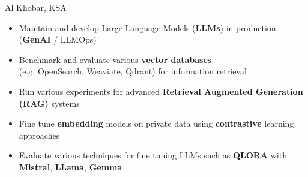 \documentclass[10pt,a4paper,ragged2e]{altacv}
\begin{document}

\begin{fullwidth}
\makecvheader
\end{fullwidth}



     {Al Khobar, KSA}

\begin{itemize}
	\item  Maintain and develop Large Language Models (\textbf{LLMs}) in production (\textbf{GenAI} / LLMOps)
	\item Benchmark and evaluate various \textbf{vector databases} \\(e.g. OpenSearch, Weaviate, Qdrant) for information retrieval
	\item Run various experiments for advanced \textbf{Retrieval Augmented Generation (RAG)} systems
	\item Fine tune \textbf{embedding} models on private data using \textbf{contrastive} learning approaches
	\item Evaluate various techniques for fine tuning LLMs such as \textbf{QLORA} with \textbf{Mistral}, \textbf{LLama}, \textbf{Gemma}

\end{itemize}
\end{document}
